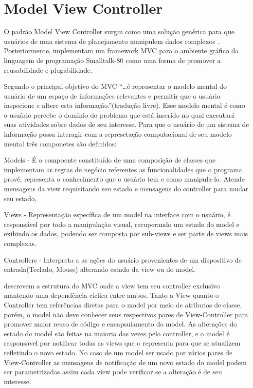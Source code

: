  


\section{Model View Controller}

O padrão Model View Controller surgiu como uma solução genérica para que
usuários de uma sistema de planejamento manipulem dados complexos
. Posteriormente, 
implementam um framework MVC para o ambiente gráfico da linguagem de programação
Smalltalk-80 como uma forma de promover a reusabilidade e plugabilidade.

Segundo  o principal objetivo do MVC
``\ldots é representar o modelo mental do usuário de um espaço de informações
relevantes e permitir que o usuário inspecione e altere esta
informação.''(tradução livre).
Esse modelo mental é como o usuário percebe o dominio do problema que está inserido no qual executará suas atividades sobre dados de seu interesse. Para que o usuário de um sistema de
informação possa interagir com a represetação computacional  de seu modelo
mental três componetes são definidos:

Models - É o compoente constituído de uma composição de classes que implementam
as regras de negócio referentes as funcionalidades que o programa provê,
representa o  conhecimento que o usuário tem e como manipula-lo. Atende
mensagens da view requisitando seu estado e mensagens do controller para mudar
seu estado,

Views - Representação específica de um model na interface com o usuário, é 
responsável por todo a manipulação visual, recuperando um estado do model e
exibindo os dados, podendo ser composta por sub-views e ser parte de views mais
complexas.

Controllers - Interpreta a as ações do usuário provenientes de um dispositivo de
entrada(Teclado, Mouse) alterando estado da view ou do model.




 descrevem a estrutura do MVC onde a view tem seu
controller exclusivo mantendo uma dependência cíclica entre ambos. Tanto a View
quanto o Controller tem referências diretas para o model por meio de atributos
de classe, porém, o model não deve conhecer seus respectivos pares de
View-Controller para promover maior reuso de código e encapsulamento do model.
As alterações do estado do model são feitas na maioria das vezes pelo controller, e
o model é responsável por notificar todas as views que o representa para que
se atualizem refletindo o novo estado. No caso de um model ser usado por vários
pares de View-Controller as mensagens de notificação de um novo estado do model
podem ser parametrizadas assim cada view pode verificar se a alteração é de seu
interesse. 

